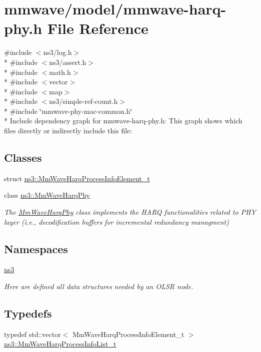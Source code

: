 \hypertarget{mmwave-harq-phy_8h}{}\section{mmwave/model/mmwave-\/harq-\/phy.h File Reference}
\label{mmwave-harq-phy_8h}
{\ttfamily \#include $<$ns3/log.\+h$>$}\\*
{\ttfamily \#include $<$ns3/assert.\+h$>$}\\*
{\ttfamily \#include $<$math.\+h$>$}\\*
{\ttfamily \#include $<$vector$>$}\\*
{\ttfamily \#include $<$map$>$}\\*
{\ttfamily \#include $<$ns3/simple-\/ref-\/count.\+h$>$}\\*
{\ttfamily \#include \char`\"{}mmwave-\/phy-\/mac-\/common.\+h\char`\"{}}\\*
Include dependency graph for mmwave-\/harq-\/phy.h\+:
This graph shows which files directly or indirectly include this file\+:
\subsection*{Classes}
\begin{DoxyCompactItemize}
\item 
struct \hyperlink{structns3_1_1MmWaveHarqProcessInfoElement__t}{ns3\+::\+Mm\+Wave\+Harq\+Process\+Info\+Element\+\_\+t}
\item 
class \hyperlink{classns3_1_1MmWaveHarqPhy}{ns3\+::\+Mm\+Wave\+Harq\+Phy}
\begin{DoxyCompactList}\small\item\em The \hyperlink{classns3_1_1MmWaveHarqPhy}{Mm\+Wave\+Harq\+Phy} class implements the H\+A\+RQ functionalities related to P\+HY layer (i.\+e., decodification buffers for incremental redundancy managment) \end{DoxyCompactList}\end{DoxyCompactItemize}
\subsection*{Namespaces}
\begin{DoxyCompactItemize}
\item 
 \hyperlink{namespacens3}{ns3}
\begin{DoxyCompactList}\small\item\em Here are defined all data structures needed by an O\+L\+SR node. \end{DoxyCompactList}\end{DoxyCompactItemize}
\subsection*{Typedefs}
\begin{DoxyCompactItemize}
\item 
typedef std\+::vector$<$ Mm\+Wave\+Harq\+Process\+Info\+Element\+\_\+t $>$ \hyperlink{namespacens3_aca7c6bab455c2515f3e437749b5e904d}{ns3\+::\+Mm\+Wave\+Harq\+Process\+Info\+List\+\_\+t}
\end{DoxyCompactItemize}
